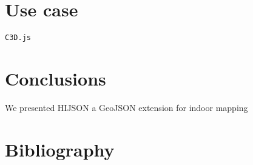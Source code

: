 \documentclass[]{article}
\begin{document}
\section{Use case}\label{use-case}

\begin{verbatim}
C3D.js
\end{verbatim}

\section{Conclusions}\label{conclusions}

We presented HIJSON a GeoJSON extension for indoor mapping

\section{Bibliography}\label{bibliography}
\end{document}
